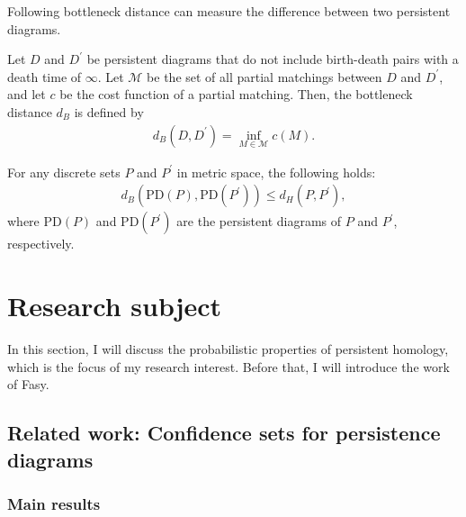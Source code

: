 \documentclass[dvipdfmx,11pt,notheorems]{article}
\begin{document}
Following bottleneck distance can measure the difference between two persistent diagrams.

\begin{dfn}
  Let $D$ and $D^\prime$ be persistent diagrams that do not include birth-death pairs with a death time of $\infty$. Let $\mathcal{M}$ be the set of all partial matchings between $D$ and $D^\prime$, and let $c$ be the cost function of a partial matching. Then, the bottleneck distance $d_B$ is defined by
  \begin{align*}
    d_B\left( D, D^\prime \right) = \inf_{M \in \mathcal{M}} c\left( M \right).
  \end{align*}
\end{dfn}

\begin{thm}\label{thm:stability-theorem}
  For any discrete sets $P$ and $P^\prime$ in metric space, the following holds:
  \begin{align*}
    d_B\left( \mathrm{PD} \left( P \right), \mathrm{PD} \left( P^\prime \right) \right) \leq d_H\left( P, P^\prime \right),
  \end{align*}
  where $\mathrm{PD} \left( P \right)$ and $\mathrm{PD} \left( P^\prime \right)$ are the persistent diagrams of $P$ and $P^\prime$, respectively.
\end{thm}

\section{Research subject}

In this section, I will discuss the probabilistic properties of persistent homology, which is the focus of my research interest. Before that, I will introduce the work of Fasy.

\subsection{Related work: Confidence sets for persistence diagrams \cite{confidence-sets-for-persistence-diagrams}}

\subsubsection{Main results}
\end{document}

